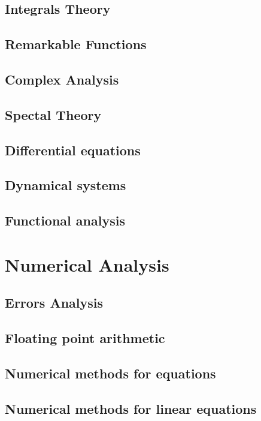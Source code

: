 \documentclass{book}
\begin{document}
  \chapter{Integrals Theory}
  
	\chapter{Remarkable Functions}
	
  \chapter{Complex Analysis}
  
  \chapter{Spectal Theory}
  
  \chapter{Differential equations}
  
	\chapter{Dynamical systems}
	
	\chapter{Functional analysis}
	
	\part{Numerical Analysis}
  \chapter{Errors Analysis}
  
	\chapter{Floating point arithmetic}
	
	\chapter{Numerical methods for equations}
	
	\chapter{Numerical methods for linear equations}
	
\end{document}
